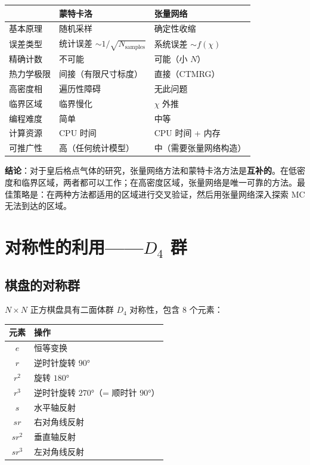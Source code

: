 \documentclass[12pt,a4paper]{ctexart}
\begin{document}
\begin{center}
\begin{tabular}{p{3.5cm}p{5cm}p{5cm}}
\toprule
 & \textbf{蒙特卡洛} & \textbf{张量网络} \\
\midrule
基本原理 & 随机采样 & 确定性收缩 \\
误差类型 & 统计误差 $\sim 1/\sqrt{N_{\text{samples}}}$ & 系统误差 $\sim f(\chi)$ \\
精确计数 & 不可能 & 可能（小 $N$） \\
热力学极限 & 间接（有限尺寸标度） & 直接（CTMRG） \\
高密度相 & 遍历性障碍 & 无此问题 \\
临界区域 & 临界慢化 & $\chi$ 外推 \\
编程难度 & 简单 & 中等 \\
计算资源 & CPU 时间 & CPU 时间 + 内存 \\
可推广性 & 高（任何统计模型） & 中（需要张量网络构造） \\
\bottomrule
\end{tabular}
\end{center}

\textbf{结论}：对于皇后格点气体的研究，张量网络方法和蒙特卡洛方法是\textbf{互补的}。在低密度和临界区域，两者都可以工作；在高密度区域，张量网络是唯一可靠的方法。最佳策略是：在两种方法都适用的区域进行交叉验证，然后用张量网络深入探索 MC 无法到达的区域。


\section{对称性的利用——$D_4$ 群}

\subsection{棋盘的对称群}

$N \times N$ 正方棋盘具有二面体群 $D_4$ 对称性，包含 8 个元素：

\begin{center}
\begin{tabular}{cl}
\toprule
元素 & 操作 \\
\midrule
$e$ & 恒等变换 \\
$r$ & 逆时针旋转 $90°$ \\
$r^2$ & 旋转 $180°$ \\
$r^3$ & 逆时针旋转 $270°$（= 顺时针 $90°$） \\
$s$ & 水平轴反射 \\
$sr$ & 右对角线反射 \\
$sr^2$ & 垂直轴反射 \\
$sr^3$ & 左对角线反射 \\
\bottomrule
\end{tabular}
\end{center}
\end{document}
